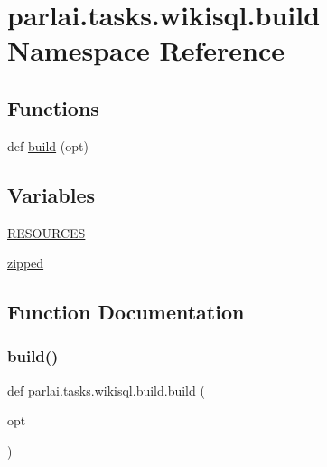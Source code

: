 \hypertarget{namespaceparlai_1_1tasks_1_1wikisql_1_1build}{}\section{parlai.\+tasks.\+wikisql.\+build Namespace Reference}
\label{namespaceparlai_1_1tasks_1_1wikisql_1_1build}
\subsection*{Functions}
\begin{DoxyCompactItemize}
\item 
def \hyperlink{namespaceparlai_1_1tasks_1_1wikisql_1_1build_a8b1665667190720ed464d8a0fcf056ba}{build} (opt)
\end{DoxyCompactItemize}
\subsection*{Variables}
\begin{DoxyCompactItemize}
\item 
\hyperlink{namespaceparlai_1_1tasks_1_1wikisql_1_1build_a6f28762458bfec32a46855606ded0884}{R\+E\+S\+O\+U\+R\+C\+ES}
\item 
\hyperlink{namespaceparlai_1_1tasks_1_1wikisql_1_1build_a614a315fb0a0058a5fc597be60bffe00}{zipped}
\end{DoxyCompactItemize}


\subsection{Function Documentation}
\mbox{\label{namespaceparlai_1_1tasks_1_1wikisql_1_1build_a8b1665667190720ed464d8a0fcf056ba}} 
\subsubsection{\texorpdfstring{build()}{build()}}
{\footnotesize\ttfamily def parlai.\+tasks.\+wikisql.\+build.\+build (\begin{DoxyParamCaption}\item[{}]{opt }\end{DoxyParamCaption})}



